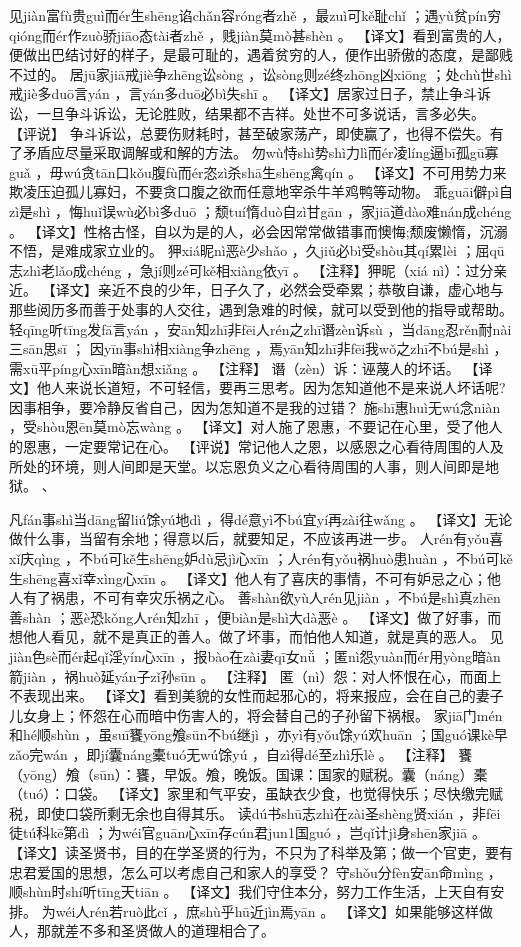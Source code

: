 \documentclass[12pt,UTF8]{ctexbook}
\begin{document}
见jiàn富fù贵guì而ér生shēng谄chǎn容róng者zhě
，最zuì可kě耻chǐ
；遇yù贫pín穷qióng而ér作zuò骄jiāo态tài者zhě
，贱jiàn莫mò甚shèn
。
【译文】看到富贵的人，便做出巴结讨好的样子，是最可耻的，遇着贫穷的人，便作出骄傲的态度，是鄙贱不过的。
居jū家jiā戒jiè争zhēng讼sòng
，讼sòng则zé终zhōng凶xiōng
；处chù世shì戒jiè多duō言yán
，言yán多duō必bì失shī
。
【译文】居家过日子，禁止争斗诉讼，一旦争斗诉讼，无论胜败，结果都不吉祥。处世不可多说话，言多必失。
【评说】 争斗诉讼，总要伤财耗时，甚至破家荡产，即使赢了，也得不偿失。有了矛盾应尽量采取调解或和解的方法。
勿wù恃shì势shì力lì而ér凌líng逼bī孤gū寡guǎ
，毋wú贪tān口kǒu腹fù而ér恣zì杀shā生shēng禽qín
。
【译文】不可用势力来欺凌压迫孤儿寡妇，不要贪口腹之欲而任意地宰杀牛羊鸡鸭等动物。
乖guāi僻pì自zì是shì
，悔huǐ误wù必bì多duō
；颓tuí惰duò自zì甘gān
，家jiā道dào难nán成chéng
。
【译文】性格古怪，自以为是的人，必会因常常做错事而懊悔;颓废懒惰，沉溺不悟，是难成家立业的。
狎xiá昵nì恶è少shǎo
，久jiǔ必bì受shòu其qí累lèi
；屈qū志zhì老lǎo成chéng
，急jí则zé可kě相xiàng依yī
。
【注释】狎昵（xiá nì）：过分亲近。
【译文】亲近不良的少年，日子久了，必然会受牵累；恭敬自谦，虚心地与那些阅历多而善于处事的人交往，遇到急难的时候，就可以受到他的指导或帮助。
轻qīng听tīng发fā言yán
，安ān知zhī非fēi人rén之zhī谮zèn诉sù
，当dāng忍rěn耐nài三sān思sī
；
因yīn事shì相xiàng争zhēng
，焉yān知zhī非fēi我wǒ之zhī不bú是shì
，需xū平píng心xīn暗àn想xiǎng
。
【注释】 谮（zèn）诉：诬蔑人的坏话。
【译文】他人来说长道短，不可轻信，要再三思考。因为怎知道他不是来说人坏话呢?因事相争，要冷静反省自己，因为怎知道不是我的过错？
施shī惠huì无wú念niàn
，受shòu恩ēn莫mò忘wàng
。
【译文】对人施了恩惠，不要记在心里，受了他人的恩惠，一定要常记在心。
【评说】常记他人之恩，以感恩之心看待周围的人及所处的环境，则人间即是天堂。以忘恩负义之心看待周围的人事，则人间即是地狱。
、

凡fán事shì当dāng留liú馀yú地dì
，得dé意yì不bú宜yí再zài往wǎng
。
【译文】无论做什么事，当留有余地；得意以后，就要知足，不应该再进一步。
人rén有yǒu喜xǐ庆qìng
，不bú可kě生shēng妒dù忌jì心xīn
；人rén有yǒu祸huò患huàn
，不bú可kě生shēng喜xǐ幸xìng心xīn
。
【译文】他人有了喜庆的事情，不可有妒忌之心；他人有了祸患，不可有幸灾乐祸之心。
善shàn欲yù人rén见jiàn
，不bú是shì真zhēn善shàn
；恶è恐kǒng人rén知zhī
，便biàn是shì大dà恶è
。
【译文】做了好事，而想他人看见，就不是真正的善人。做了坏事，而怕他人知道，就是真的恶人。
见jiàn色sè而ér起qǐ淫yín心xīn
，报bào在zài妻qī女nǚ
；匿nì怨yuàn而ér用yòng暗àn箭jiàn
，祸huò延yán子zǐ孙sūn
。
【注释】 匿（nì）怨：对人怀恨在心，而面上不表现出来。
【译文】看到美貌的女性而起邪心的，将来报应，会在自己的妻子儿女身上；怀怨在心而暗中伤害人的，将会替自己的子孙留下祸根。
家jiā门mén和hé顺shùn
，虽suī饔yōng飧sūn不bú继jì
，亦yì有yǒu馀yú欢huān
；国guó课kè早zǎo完wán
，即jí囊náng橐tuó无wú馀yú
，自zì得dé至zhì乐lè
。
【注释】 饔（yōng）飧（sūn）：饔，早饭。飧，晚饭。国课：国家的赋税。囊（náng）橐（tuó）：口袋。
【译文】家里和气平安，虽缺衣少食，也觉得快乐；尽快缴完赋税，即使口袋所剩无余也自得其乐。
读dú书shū志zhì在zài圣shèng贤xián
，非fēi徒tú科kē第dì
；为wéi官guān心xīn存cún君jun1国guó
，岂qǐ计jì身shēn家jiā
。
【译文】读圣贤书，目的在学圣贤的行为，不只为了科举及第；做一个官吏，要有忠君爱国的思想，怎么可以考虑自己和家人的享受？
守shǒu分fèn安ān命mìng
，顺shùn时shí听tīng天tiān
。
【译文】我们守住本分，努力工作生活，上天自有安排。
为wéi人rén若ruò此cǐ
，庶shù乎hū近jìn焉yān
。
【译文】如果能够这样做人，那就差不多和圣贤做人的道理相合了。

\backmatter
\end{document}
